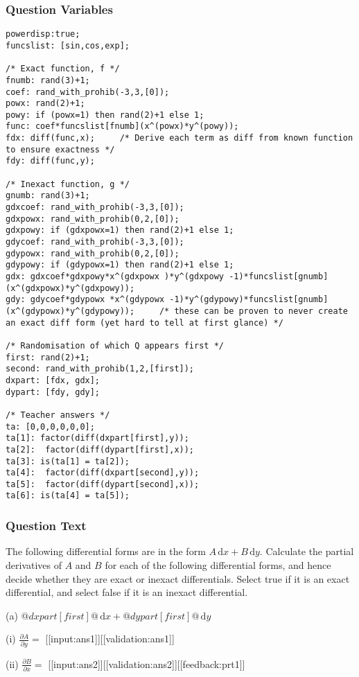 \documentclass[a4paper,10pt]{article}
\begin{document}
\subsubsection{Question Variables}
\begin{lstlisting}
powerdisp:true;
funcslist: [sin,cos,exp];

/* Exact function, f */
fnumb: rand(3)+1;
coef: rand_with_prohib(-3,3,[0]);
powx: rand(2)+1;
powy: if (powx=1) then rand(2)+1 else 1;
func: coef*funcslist[fnumb](x^(powx)*y^(powy));
fdx: diff(func,x);     /* Derive each term as diff from known function to ensure exactness */
fdy: diff(func,y);

/* Inexact function, g */
gnumb: rand(3)+1;
gdxcoef: rand_with_prohib(-3,3,[0]);
gdxpowx: rand_with_prohib(0,2,[0]);
gdxpowy: if (gdxpowx=1) then rand(2)+1 else 1;
gdycoef: rand_with_prohib(-3,3,[0]);
gdypowx: rand_with_prohib(0,2,[0]);
gdypowy: if (gdypowx=1) then rand(2)+1 else 1;
gdx: gdxcoef*gdxpowy*x^(gdxpowx )*y^(gdxpowy -1)*funcslist[gnumb](x^(gdxpowx)*y^(gdxpowy));
gdy: gdycoef*gdypowx *x^(gdypowx -1)*y^(gdypowy)*funcslist[gnumb](x^(gdypowx)*y^(gdypowy));     /* these can be proven to never create an exact diff form (yet hard to tell at first glance) */

/* Randomisation of which Q appears first */
first: rand(2)+1;
second: rand_with_prohib(1,2,[first]);
dxpart: [fdx, gdx];
dypart: [fdy, gdy];

/* Teacher answers */
ta: [0,0,0,0,0,0];
ta[1]: factor(diff(dxpart[first],y));
ta[2]:  factor(diff(dypart[first],x));
ta[3]: is(ta[1] = ta[2]);
ta[4]:  factor(diff(dxpart[second],y));
ta[5]:  factor(diff(dypart[second],x));
ta[6]: is(ta[4] = ta[5]);
\end{lstlisting}
\subsubsection{Question Text}
The following differential forms are in the form $A \, \text{d}x + B \, \text{d}y$. Calculate the partial derivatives of $A$ and $B$ for each of the following differential forms, and hence decide whether they are exact or inexact differentials. Select true if it is an exact differential, and select false if it is an inexact differential.

(a) $@dxpart[first]@ \, \text{d}x + @dypart[first]@ \, \text{d}y$ 

(i) $\frac{\partial A}{\partial y} = $ [[input:ans1]][[validation:ans1]] 

(ii) $\frac{\partial B}{\partial x} = $ [[input:ans2]][[validation:ans2]][[feedback:prt1]]
\end{document}
